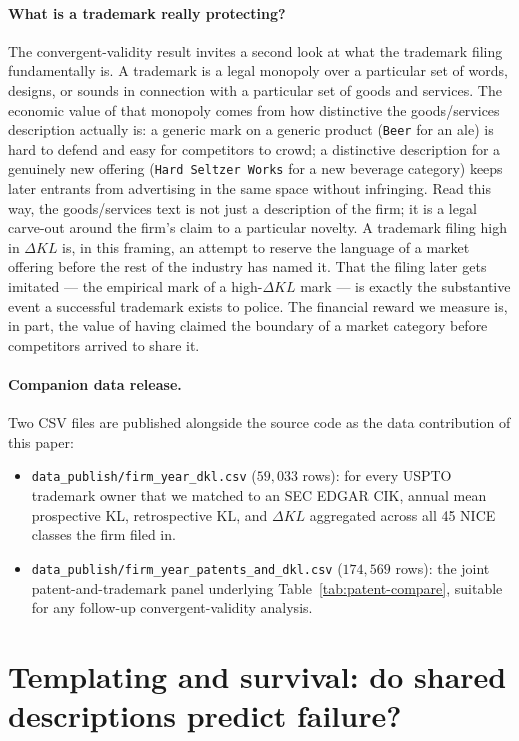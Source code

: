 \documentclass[11pt]{article}
\begin{document}
\paragraph{What is a trademark really protecting?}
The convergent-validity result invites a second look at what the
trademark filing fundamentally is. A trademark is a legal monopoly
over a particular set of words, designs, or sounds in connection
with a particular set of goods and services. The economic value of
that monopoly comes from how distinctive the goods/services
description actually is: a generic mark on a generic product
(\texttt{Beer} for an ale) is hard to defend and easy for competitors
to crowd; a distinctive description for a genuinely new offering
(\texttt{Hard Seltzer Works} for a new beverage category) keeps
later entrants from advertising in the same space without infringing.
Read this way, the goods/services text is not just a description of
the firm; it is a legal carve-out around the firm's claim to a
particular novelty. A trademark filing high in $\Delta KL$ is, in
this framing, an attempt to reserve the language of a market
offering before the rest of the industry has named it. That the
filing later gets imitated --- the empirical mark of a high-$\Delta KL$
mark --- is exactly the substantive event a successful trademark
exists to police. The financial reward we measure is, in part, the
value of having claimed the boundary of a market category before
competitors arrived to share it.

\paragraph{Companion data release.}
Two CSV files are published alongside the source code as the data
contribution of this paper:
\begin{itemize}
  \item \texttt{data\_publish/firm\_year\_dkl.csv} ($59{,}033$ rows): for
    every USPTO trademark owner that we matched to an SEC EDGAR CIK,
    annual mean prospective KL, retrospective KL, and $\Delta KL$
    aggregated across all 45 NICE classes the firm filed in.
  \item \texttt{data\_publish/firm\_year\_patents\_and\_dkl.csv}
    ($174{,}569$ rows): the joint patent-and-trademark panel
    underlying Table~\ref{tab:patent-compare}, suitable for any
    follow-up convergent-validity analysis.
\end{itemize}

\section{Templating and survival: do shared descriptions predict failure?}
\label{sec:templated-survival}
\end{document}
